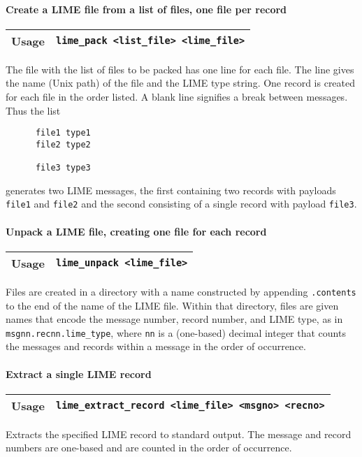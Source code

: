 \documentclass{article}
\begin{document}
\paragraph{Create a LIME file from a list of files, one file per record}
%
\begin{flushleft}
  \begin{tabular}{|l|l|}
  \hline
  Usage     & \verb|lime_pack <list_file> <lime_file>| \\
  \hline
 \end{tabular}
\end{flushleft}
%
The file with the list of files to be packed has one line for each file.
The line gives the name (Unix path) of the file and the LIME type string.
One record is created for each file in the order listed.  A blank line
signifies a break between messages.  Thus the list
%
\begin{verbatim}
      file1 type1
      file2 type2

      file3 type3
\end{verbatim}
%
generates two LIME messages, the first containing two records with
payloads {\tt file1} and {\tt file2} and the second consisting of a
single record with payload {\tt file3}.

\paragraph{Unpack a LIME file, creating one file for each record}
%
\begin{flushleft}
  \begin{tabular}{|l|l|}
  \hline
  Usage     & \verb|lime_unpack <lime_file>| \\
  \hline
 \end{tabular}
\end{flushleft}
%
Files are created in a directory with a name constructed by appending
{\tt .contents} to the end of the name of the LIME file.  Within that
directory, files are given names that encode the message number,
record number, and LIME type, as in {\tt msgnn.recnn.lime\_type},
where {\tt nn} is a (one-based) decimal integer that counts the
messages and records within a message in the order of occurrence.

\paragraph{Extract a single LIME record}
%
\begin{flushleft}
  \begin{tabular}{|l|l|}
  \hline
  Usage     & \verb|lime_extract_record <lime_file> <msgno> <recno>| \\
  \hline
 \end{tabular}
\end{flushleft}
%
Extracts the specified LIME record to standard output.  The message
and record numbers are one-based and are counted in the order of
occurrence.
\end{document}
